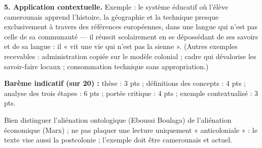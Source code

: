 \documentclass[11pt]{article}
\begin{document}
\begin{corrige}
\textbf{5. Application contextuelle.} Exemple : le système éducatif où l'élève camerounais apprend l'histoire, la géographie et la technique presque exclusivement à travers des références européennes, dans une langue qui n'est pas celle de sa communauté — il réussit scolairement en se dépossédant de ses savoirs et de sa langue : il « vit une vie qui n'est pas la sienne ». (Autres exemples recevables : administration copiée sur le modèle colonial ; cadre qui dévalorise les savoir-faire locaux ; consommation technique sans appropriation.)

\textbf{Barème indicatif (sur 20) :} thèse : 3 pts ; définitions des concepts : 4 pts ; analyse des trois étapes : 6 pts ; portée critique : 4 pts ; exemple contextualisé : 3 pts.
\end{corrige}

\begin{attention}
Bien distinguer l'aliénation ontologique (Eboussi Boulaga) de l'aliénation économique (Marx) ; ne pas plaquer une lecture uniquement « anticoloniale » : le texte vise aussi la postcolonie ; l'exemple doit être camerounais et actuel.
\end{attention}
\end{document}

